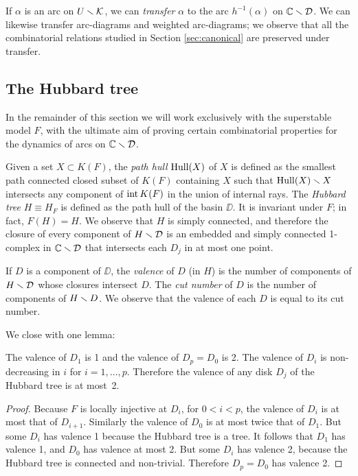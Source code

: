 If $\alpha$ is an arc on $U \smallsetminus {\mathcal K}$,
we can \emph{transfer} $\alpha$  to the arc $h^{-1}(\alpha)$ on ${\Bbb C} \smallsetminus {{\mathcal D}}$. 
We can likewise transfer arc-diagrams and weighted arc-diagrams;
we observe that all the combinatorial relations studied in Section \ref{sec:canonical}
are preserved under transfer. 


\subsection{The Hubbard tree}
In the remainder of this section we will work exclusively with the superstable model $F$,
with the ultimate aim of proving certain combinatorial properties for the dynamics of arcs on ${\Bbb C} \smallsetminus {\mathcal D}$.

Given a set $X\subset K(F)$, the {\it path hull} $\operatorname{Hull}(X)$ of $X$ is defined as the smallest
path connected closed subset of $K(F)$ containing $X$ such that $\operatorname{Hull}(X) \smallsetminus X$ intersects any component
of $\operatorname{int} K(F)$ in the union of internal rays.  The {\it Hubbard tree} $H\equiv H_F$
is defined as the path hull of the basin $\DD$.
It is invariant under $F$; in fact, $F(H)=H$.
We observe that $H$ is simply connected, and therefore 
the closure of every component of $H \smallsetminus {{\mathcal D}}$ is an embedded and simply connected 1-complex in ${\Bbb C} \smallsetminus {\mathcal D}$
that intersects each $D_j$ in at most one point.

If $D$ is a component of $\DD$,
the \emph{valence} of $D$ (in $H$) is the number of components of $H \smallsetminus  {\mathcal D}$ whose closures intersect $D$. 
The \emph{cut number} of $D$ is the number of components of $H \smallsetminus  D$. 
We observe that the valence of each $D$ is equal to its cut number.

We close with one lemma:
\begin{lem}\label{valence}
The valence of $D_1$ is 1 and the valence of $D_p = D_0$ is 2. 
The valence of $D_i$ is non-decreasing in $i$ for $i = 1, \ldots, p$. 
Therefore the valence of any disk $D_j$ of the Hubbard tree is at most~2.
\end{lem}
\begin{proof}
Because $F$ is locally injective at $D_i$, for $0 < i < p$,
the valence of $D_i$ is at most that of $D_{i+1}$. 
Similarly the valence of $D_0$ is at most twice that of $D_1$.
But some $D_i$ has valence 1 because the Hubbard tree is a tree. 
It follows that $D_1$ has valence 1, and $D_0$ has valence at most 2.
But some $D_i$ has valence 2, because the Hubbard tree is connected and non-trivial. 
Therefore $D_p = D_0$ has valence 2.  
\end{proof}


